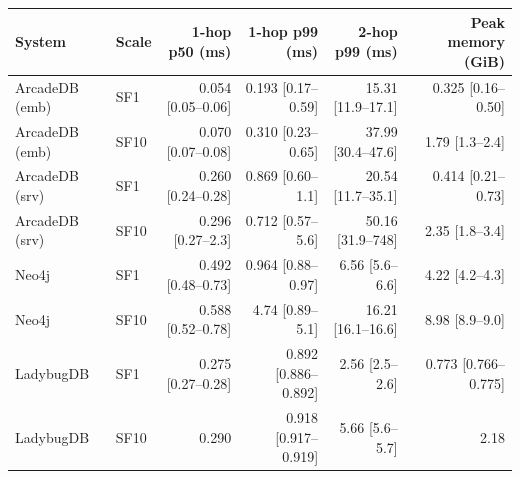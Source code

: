 \begin{tabular}{llrrrr}
\toprule
System & Scale & 1-hop p50 (ms) & 1-hop p99 (ms) & 2-hop p99 (ms) & Peak memory (GiB) \\
\midrule
ArcadeDB (emb) & SF1 & 0.054 [0.05--0.06] & 0.193 [0.17--0.59] & 15.31 [11.9--17.1] & 0.325 [0.16--0.50] \\
ArcadeDB (emb) & SF10 & 0.070 [0.07--0.08] & 0.310 [0.23--0.65] & 37.99 [30.4--47.6] & 1.79 [1.3--2.4] \\
ArcadeDB (srv) & SF1 & 0.260 [0.24--0.28] & 0.869 [0.60--1.1] & 20.54 [11.7--35.1] & 0.414 [0.21--0.73] \\
ArcadeDB (srv) & SF10 & 0.296 [0.27--2.3] & 0.712 [0.57--5.6] & 50.16 [31.9--748] & 2.35 [1.8--3.4] \\
Neo4j & SF1 & 0.492 [0.48--0.73] & 0.964 [0.88--0.97] & 6.56 [5.6--6.6] & 4.22 [4.2--4.3] \\
Neo4j & SF10 & 0.588 [0.52--0.78] & 4.74 [0.89--5.1] & 16.21 [16.1--16.6] & 8.98 [8.9--9.0] \\
LadybugDB & SF1 & 0.275 [0.27--0.28] & 0.892 [0.886--0.892] & 2.56 [2.5--2.6] & 0.773 [0.766--0.775] \\
LadybugDB & SF10 & 0.290 & 0.918 [0.917--0.919] & 5.66 [5.6--5.7] & 2.18 \\
\bottomrule
\end{tabular}
